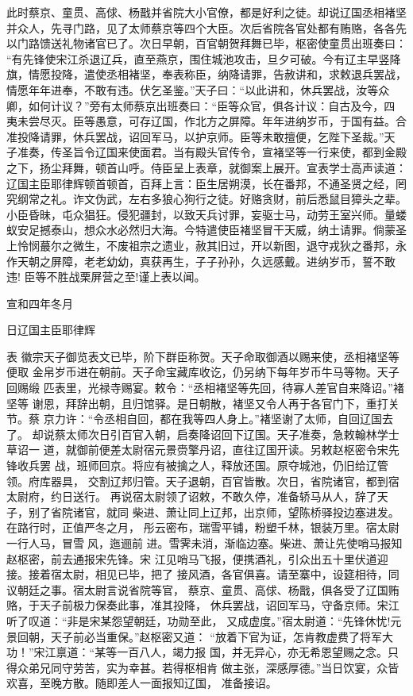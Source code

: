 此时蔡京、童贯、高俅、杨戬并省院大小官僚，都是好利之徒。却说辽国丞相褚坚
并众人，先寻门路，见了太师蔡京等四个大臣。次后省院各官处都有贿赂，各各先
以门路馈送礼物诸官已了。次日早朝，百官朝贺拜舞已毕，枢密使童贯出班奏曰：
“有先锋使宋江杀退辽兵，直至燕京，围住城池攻击，旦夕可破。今有辽主早竖降
旗，情愿投降，遣使丞相褚坚，奉表称臣，纳降请罪，告赦讲和，求敕退兵罢战，
情愿年年进奉，不敢有违。伏乞圣鉴。”天子曰：“以此讲和，休兵罢战，汝等众
卿，如何计议？”旁有太师蔡京出班奏曰：“臣等众官，俱各计议：自古及今，四
夷未尝尽灭。臣等愚意，可存辽国，作北方之屏障。年年进纳岁币，于国有益。合
准投降请罪，休兵罢战，诏回军马，以护京师。臣等未敢擅便，乞陛下圣裁。”天
子准奏，传圣旨令辽国来使面君。当有殿头官传令，宣褚坚等一行来使，都到金殿
之下，扬尘拜舞，顿首山呼。侍臣呈上表章，就御案上展开。宣表学士高声读道：
辽国主臣耶律辉顿首顿首，百拜上言：臣生居朔漠，长在番邦，不通圣贤之经，罔
究纲常之礼。诈文伪武，左右多狼心狗行之徒。好赂贪财，前后悉鼠目獐头之辈。
小臣昏昧，屯众猖狂。侵犯疆封，以致天兵讨罪，妄驱士马，动劳王室兴师。量蝼
蚁安足撼泰山，想众水必然归大海。今特遣使臣褚坚冒干天威，纳土请罪。倘蒙圣
上怜悯蕞尔之微生，不废祖宗之遗业，赦其旧过，开以新图，退守戎狄之番邦，永
作天朝之屏障，老老幼幼，真获再生，子子孙孙，久远感戴。进纳岁币，誓不敢违!
臣等不胜战栗屏营之至!谨上表以闻。

宣和四年冬月

日辽国主臣耶律辉

表
徽宗天子御览表文已毕，阶下群臣称贺。天子命取御酒以赐来使，丞相褚坚等便取
金帛岁币进在朝前。天子命宝藏库收讫，仍另纳下每年岁币牛马等物。天子回赐缎
匹表里，光禄寺赐宴。敕令：“丞相褚坚等先回，待寡人差官自来降诏。”褚坚等
谢恩，拜辞出朝，且归馆驿。是日朝散，褚坚又令人再于各官门下，重打关节。蔡
京力许：“令丞相自回，都在我等四人身上。”褚坚谢了太师，自回辽国去了。
却说蔡太师次日引百官入朝，启奏降诏回下辽国。天子准奏，急敕翰林学士草诏一
道，就御前便差太尉宿元景赍擎丹诏，直往辽国开读。另敕赵枢密令宋先锋收兵罢
战，班师回京。将应有被擒之人，释放还国。原夺城池，仍旧给辽管领。府库器具，
交割辽邦归管。天子退朝，百官皆散。次日，省院诸官，都到宿太尉府，约日送行。
再说宿太尉领了诏敕，不敢久停，准备轿马从人，辞了天子，别了省院诸官，就同
柴进、萧让同上辽邦，出京师，望陈桥驿投边塞进发。在路行时，正值严冬之月，
彤云密布，瑞雪平铺，粉塑千林，银装万里。宿太尉一行人马，冒雪风，迤逦前
进。雪霁未消，渐临边塞。柴进、萧让先使哨马报知赵枢密，前去通报宋先锋。宋
江见哨马飞报，便携酒礼，引众出五十里伏道迎接。接着宿太尉，相见已毕，把了
接风酒，各官俱喜。请至寨中，设筵相待，同议朝廷之事。宿太尉言说省院等官，
蔡京、童贯、高俅、杨戬，俱各受了辽国贿赂，于天子前极力保奏此事，准其投降，
休兵罢战，诏回军马，守备京师。宋江听了叹道：“非是宋某怨望朝廷，功勋至此，
又成虚度。”宿太尉道：“先锋休忧!元景回朝，天子前必当重保。”赵枢密又道：
“放着下官为证，怎肯教虚费了将军大功！”宋江禀道：“某等一百八人，竭力报
国，并无异心，亦无希恩望赐之念。只得众弟兄同守劳苦，实为幸甚。若得枢相肯
做主张，深感厚德。”当日饮宴，众皆欢喜，至晚方散。随即差人一面报知辽国，
准备接诏。

